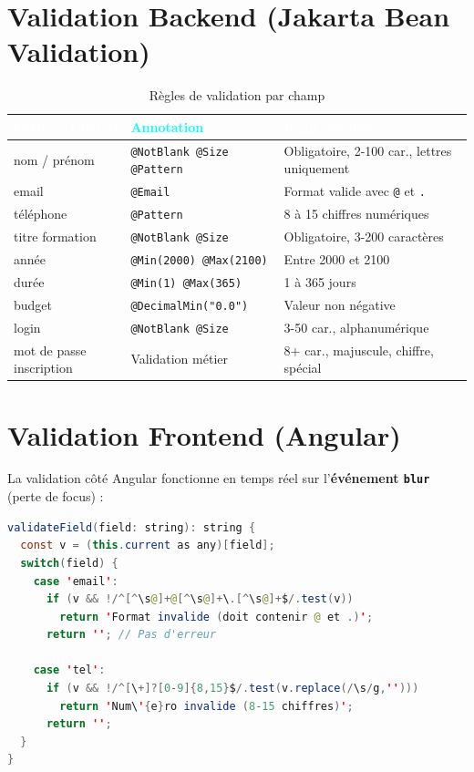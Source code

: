 \documentclass[12pt,a4paper]{report}
\begin{document}
\section{Validation Backend (Jakarta Bean Validation)}

\begin{table}[H]
\centering
\caption{R\`{e}gles de validation par champ}
\small
\begin{tabularx}{\textwidth}{|L{3.2cm}|L{4.5cm}|X|}
\hline
{}
\textcolor{white}{\textbf{Entit\'{e} / Champ}} &
\textcolor{cyan}{\textbf{Annotation}} &
\textcolor{white}{\textbf{R\`{e}gle appliqu\'{e}e}} \\
\hline
nom / pr\'{e}nom & \texttt{@NotBlank @Size @Pattern} & Obligatoire, 2-100 car., lettres uniquement \\
\hline
email & \texttt{@Email} & Format valide avec \texttt{@} et \texttt{.} \\
\hline
t\'{e}l\'{e}phone & \texttt{@Pattern} & 8 \`{a} 15 chiffres num\'{e}riques \\
\hline
titre formation & \texttt{@NotBlank @Size} & Obligatoire, 3-200 caract\`{e}res \\
\hline
ann\'{e}e & \texttt{@Min(2000) @Max(2100)} & Entre 2000 et 2100 \\
\hline
dur\'{e}e & \texttt{@Min(1) @Max(365)} & 1 \`{a} 365 jours \\
\hline
budget & \texttt{@DecimalMin("0.0")} & Valeur non n\'{e}gative \\
\hline
login & \texttt{@NotBlank @Size} & 3-50 car., alphanum\'{e}rique \\
\hline
mot de passe inscription & Validation m\'{e}tier & 8+ car., majuscule, chiffre, sp\'{e}cial \\
\hline
\end{tabularx}
\end{table}

\section{Validation Frontend (Angular)}

La validation c\^{o}t\'{e} Angular fonctionne en temps r\'{e}el sur l'\textbf{\'{e}v\'{e}nement \texttt{blur}} (perte de focus) :

\begin{lstlisting}[language=Java, caption={Exemple de validation Angular dans participants.component.ts}]
validateField(field: string): string {
  const v = (this.current as any)[field];
  switch(field) {
    case 'email':
      if (v && !/^[^\s@]+@[^\s@]+\.[^\s@]+$/.test(v))
        return 'Format invalide (doit contenir @ et .)';
      return ''; // Pas d'erreur

    case 'tel':
      if (v && !/^[\+]?[0-9]{8,15}$/.test(v.replace(/\s/g,'')))
        return 'Num\'{e}ro invalide (8-15 chiffres)';
      return '';
  }
}
\end{lstlisting}
\end{document}

